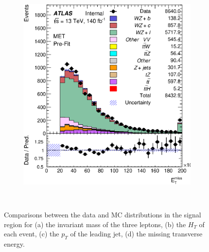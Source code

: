 \documentclass[NOTE, atlasdraft=true, texlive=2016, UKenglish]{\ATLASLATEXPATH atlasdoc}
\begin{document}
\begin{figure}[H]
\begin{subfigure}{.48\textwidth}
        \caption{}
        \label{fig:jetPt}
    \end{subfigure}%
    \begin{subfigure}{.48\textwidth}
        \includegraphics[width=1\linewidth]{kinematics/MET.eps}
        \caption{}
        \label{fig:met}
    \end{subfigure}\\
    \caption{Comparisons between the data and MC distributions in the signal region for (a) the invariant mass of the three leptons, (b) the $H_T$ of each event, (c) the $p_T$ of the leading jet, (d) the missing transverse energy.}    
\end{figure}
\end{document}
